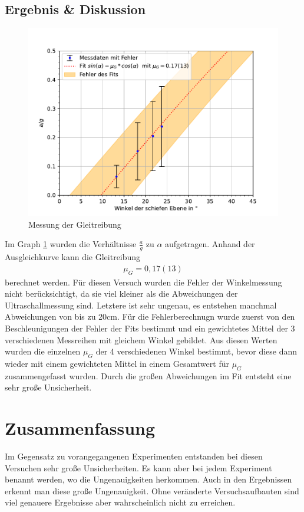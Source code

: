 \documentclass[11pt, a4paper]{article}
\begin{document}
    \subsection{Ergebnis \& Diskussion}
    \begin{figure}
        \centering
        \includegraphics[width=\textwidth]{./7Plotgleit.pdf}

        \caption{Messung der Gleitreibung}
        \label{fig:Gleitr}
    \end{figure}
    Im Graph \ref{fig:Gleitr} wurden die Verhältnisse $\frac{a}{g}$ zu $\alpha$ aufgetragen. Anhand der Ausgleichkurve kann die Gleitreibung
    \begin{align}
        \mu_G = 0,17(13)
    \end{align}
    berechnet werden. Für diesen Versuch wurden die Fehler der Winkelmessung nicht berücksichtigt, da sie viel kleiner als
    die Abweichungen der Ultraschallmessung sind. Letztere ist sehr ungenau, es entstehen manchmal Abweichungen von bis zu 20cm.
     Für die Fehlerberechnugn wurde zuerst von den Beschleunigungen der
    Fehler der Fits bestimmt und ein gewichtetes Mittel der 3 verschiedenen Messreihen mit gleichem Winkel gebildet.
    Aus diesen Werten wurden die einzelnen $\mu_G$ der 4 verschiedenen Winkel bestimmt, bevor diese dann wieder
    mit einem gewichteten Mittel in einem Gesamtwert für $\mu_G$ zusammengefasst wurden. Durch die großen Abweichungen
    im Fit entsteht eine sehr große Unsicherheit.

    \section{Zusammenfassung}

    Im Gegensatz zu vorangegangenen Experimenten entstanden bei diesen Versuchen sehr große Unsicherheiten. Es kann aber 
    bei jedem Experiment benannt werden, wo die Ungenauigkeiten herkommen. Auch in den Ergebnissen erkennt man diese große Ungenauigkeit.
    Ohne veränderte Versuchsaufbauten sind viel genauere Ergebnisse aber wahrscheinlich nicht zu erreichen.

    
    
\end{document}
